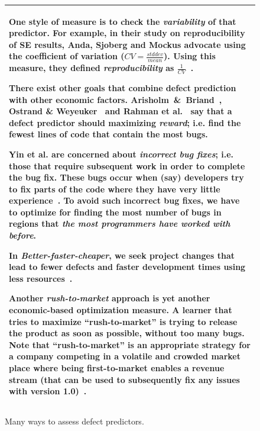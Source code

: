 \documentclass{sig-alternative}
\begin{document}
\begin{figure}[!b]
\small
\begin{tabular}{|p{.95\linewidth}|}\hline
One style
of measure is to check the {\em variability} of that predictor.
For example,
in their study on reproducibility of SE results,
 Anda, Sjoberg and Mockus advocate using the coefficient of variation ($CV=\frac{stddev}{mean}$).
Using this measure, they defined {\em reproducibility} as $\frac{1}{CV}$~\cite{anda09}.

There exist other goals that combine defect prediction with other economic
factors.
Arisholm~\&~Briand~\cite{arisholm06},  Ostrand \& Weyeuker~\cite{ostrand04} and Rahman et al.~\cite{rahman12}
say that a defect predictor should maximizing {\em reward}; i.e. find the fewest lines of code
that contain the most bugs.

Yin et al. are concerned about
 {\em incorrect bug fixes}; i.e. those that require subsequent work in order to complete the bug fix.
These bugs occur  when (say) developers try to fix parts of the code
where they have very little experience~\cite{yin11}.  To avoid such incorrect bug fixes, we have to optimize
for finding the most number of bugs in regions that {\em the most programmers have worked with before}.

In {\em Better-faster-cheaper}, we seek  project changes that lead
to fewer defects and faster development times using less resources~\cite{Green,elrawas08,elrawas10,me07f,me09a,me09f}.

Another  {\em  rush-to-market} approach is yet another economic-based optimization measure.
A learner that tries to maximize ``rush-to-market'' is trying to release the product as soon
as possible, without too many bugs. Note that ``rush-to-market'' is an appropriate strategy for a company competing
in a volatile and crowded market place where being first-to-market enables a revenue stream (that can be
used to subsequently fix any issues with version 1.0)~\cite{huang06}.\\\hline
\end{tabular}
\caption{Many ways to assess defect predictors.}\label{fig:criteria}
\end{figure}
\end{document}
